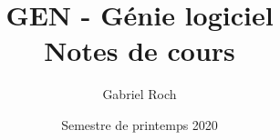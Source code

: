 \documentclass[a4paper,11pt]{report}
\title{GEN - Génie logiciel\\Notes de cours}
\author{Gabriel Roch}
\date{Semestre de printemps 2020}
\begin{document}
\maketitle
\tableofcontents


\begin{abstract}
\end{abstract}

\chapter{}
\end{document}
